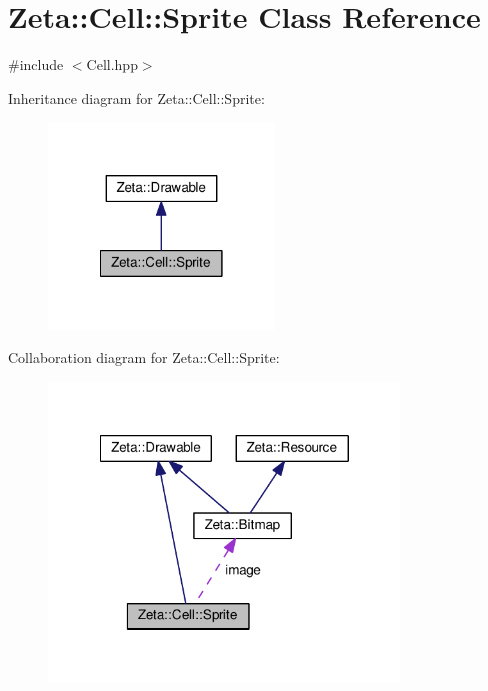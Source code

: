 \hypertarget{classZeta_1_1Cell_1_1Sprite}{\section{Zeta\+:\+:Cell\+:\+:Sprite Class Reference}
\label{classZeta_1_1Cell_1_1Sprite}
}


{\ttfamily \#include $<$Cell.\+hpp$>$}



Inheritance diagram for Zeta\+:\+:Cell\+:\+:Sprite\+:\nopagebreak
\begin{figure}[H]
\begin{center}
\leavevmode
\includegraphics[width=170pt]{classZeta_1_1Cell_1_1Sprite__inherit__graph}
\end{center}
\end{figure}


Collaboration diagram for Zeta\+:\+:Cell\+:\+:Sprite\+:\nopagebreak
\begin{figure}[H]
\begin{center}
\leavevmode
\includegraphics[width=264pt]{classZeta_1_1Cell_1_1Sprite__coll__graph}
\end{center}
\end{figure}
